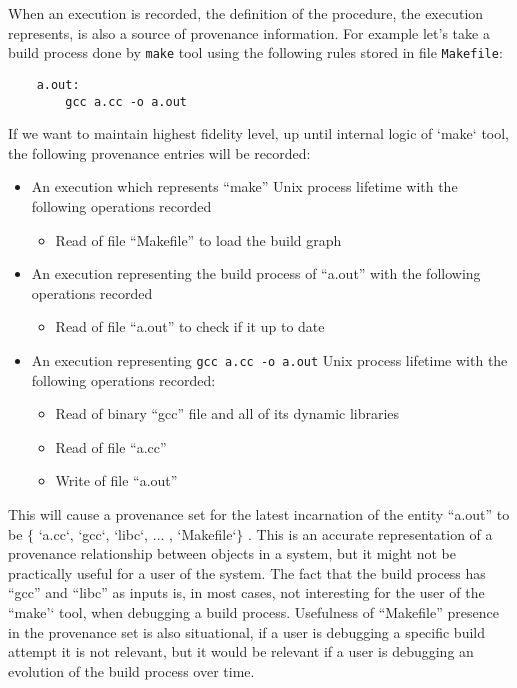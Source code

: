 When an execution is recorded, the definition of the procedure, the execution represents, is also a source of provenance information. For example let’s take a build process done by \texttt{make} tool using the following rules stored in file \texttt{Makefile}:

\begin{verbatim}
    a.out:
        gcc a.cc -o a.out
\end{verbatim}

If we want to maintain highest fidelity level, up until internal logic of `make` tool, the following provenance entries will be recorded:
%
\begin{itemize}[nosep]
	\item An execution which represents ``make'' Unix process lifetime with the following operations recorded
    \begin{itemize}[nosep]
    	\item Read of file ``Makefile'' to load the build graph
    \end{itemize}
	\item An execution representing the build process of ``a.out'' with the following operations recorded
    \begin{itemize}[nosep]
    	\item Read of file ``a.out'' to check if it up to date
    \end{itemize}
	\item An execution representing \texttt{gcc a.cc -o a.out} Unix process lifetime with the following operations recorded:
    \begin{itemize}[nosep]
    	\item Read of binary ``gcc'' file and all of its dynamic libraries
    	\item Read of file ``a.cc''
    	\item Write of file ``a.out''
    \end{itemize}
\end{itemize}

This will cause a provenance set for the latest incarnation of the entity ``a.out'' to be $ \{ $ `a.cc`, `gcc`, `libc`, $ \ldots $ , `Makefile`$ \} $ . This is an accurate representation of a provenance relationship between objects in a system, but it might not be practically useful for a user of the system. The fact that the build process has ``gcc'' and ``libc'' as inputs is, in most cases, not interesting for the user of the ``make'` tool, when debugging a build process. Usefulness of ``Makefile'' presence in the provenance set is also situational, if a user is debugging a specific build attempt it is not relevant, but it would be relevant if a user is debugging an evolution of the build process over time.

